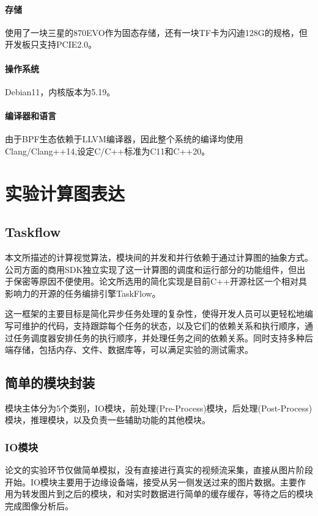 \documentclass[master]{shtthesis}
\begin{document}
\paragraph{存储}使用了一块三星的870EVO作为固态存储，还有一块TF卡为闪迪128G的规格，但开发板只支持PCIE2.0。

\paragraph{操作系统}Debian11，内核版本为5.19。

\paragraph{编译器和语言}由于BPF生态依赖于LLVM编译器，因此整个系统的编译均使用Clang/Clang++14,设定C/C++标准为C11和C++20。

\section{实验计算图表达}
\subsection{Taskflow}
本文所描述的计算视觉算法，模块间的并发和并行依赖于通过计算图的抽象方式。公司方面的商用SDK独立实现了这一计算图的调度和运行部分的功能组件，但出于保密等原因不便使用。论文所选用的简化实现是目前C++开源社区一个相对具影响力的开源的任务编排引擎TaskFlow\cite{huang2019cpp}。

这一框架的主要目标是简化异步任务处理的复杂性，使得开发人员可以更轻松地编写可维护的代码，支持跟踪每个任务的状态，以及它们的依赖关系和执行顺序，通过任务调度器安排任务的执行顺序，并处理任务之间的依赖关系。同时支持多种后端存储，包括内存、文件、数据库等，可以满足实验的测试需求。

\subsection{简单的模块封装}
模块主体分为5个类别，IO模块，前处理(Pre-Process)模块，后处理(Post-Process)模块，推理模块，以及负责一些辅助功能的其他模块。
\subsubsection{IO模块}
论文的实验环节仅做简单模拟，没有直接进行真实的视频流采集，直接从图片阶段开始。IO模块主要用于边缘设备端，接受从另一侧发送过来的图片数据。主要作用为转发图片到之后的模块，和对实时数据进行简单的缓存缓存，等待之后的模块完成图像分析后。
\end{document}
